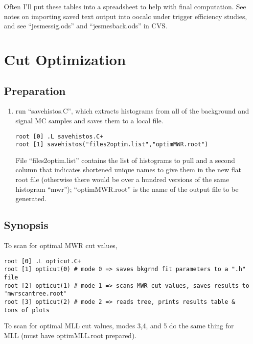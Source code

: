 \documentclass[english]{article}
\begin{document}
Often I'll put these tables into a spreadsheet to help with final
computation. See notes on importing saved text output into oocalc under
trigger efficiency studies, and see ``jesmessig.ods'' and ``jesmesback.ods''
in CVS.

\section{Cut Optimization}

\subsection{Preparation}
%
\begin{enumerate}
\item run ``savehistos.C'', which extracts histograms from all of the
background and signal MC samples and saves them to a local file.
%
\begin{lstlisting}
root [0] .L savehistos.C+
root [1] savehistos("files2optim.list","optimMWR.root")
\end{lstlisting}
%
File ``files2optim.list'' contains the list of histograms to pull
and a second column that indicates shortened unique names to give them
in the new flat root file (otherwise there would be over a hundred
versions of the same histogram ``mwr''); ``optimMWR.root'' is the
name of the output file to be generated.
%
\end{enumerate}

\subsection{Synopsis}
%
To scan for optimal MWR cut values,
\begin{lstlisting}
root [0] .L opticut.C+
root [1] opticut(0) # mode 0 => saves bkgrnd fit parameters to a ".h" file
root [2] opticut(1) # mode 1 => scans MWR cut values, saves results to "mwrscantree.root"
root [3] opticut(2) # mode 2 => reads tree, prints results table & tons of plots
\end{lstlisting}
%
To scan for optimal MLL cut values, modes 3,4, and 5 do the same thing
for MLL (must have optimMLL.root prepared).

\end{document}
